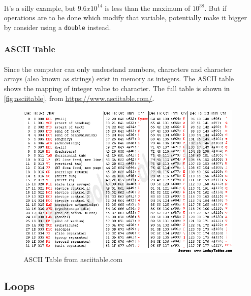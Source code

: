 \documentclass[letter,11pt]{article}
\begin{document}
\paragraph{}It's a silly example, but $9.6 x 10^{14}$ is less than the maximum of $10^{38}$. But if operations are to be done which modify that variable, potentially make it bigger by consider using a \texttt{double} instead.

\FloatBarrier
\subsubsection{ASCII Table}
\paragraph{}Since the computer can only understand numbers, characters and character arrays (also known as strings) exist in memory as integers. The ASCII table shows the mapping of integer value to character. The full table is shown in \autoref{fig:asciitable}, from \url{https://www.asciitable.com/}.

\begin{figure}[h!]
    \includegraphics[scale=0.72]{FinalExam/asciifull.png}
    \caption{ASCII Table from asciitable.com}
    \label{fig:asciitable}
\end{figure}

\FloatBarrier
\subsection{Loops}
\end{document}
